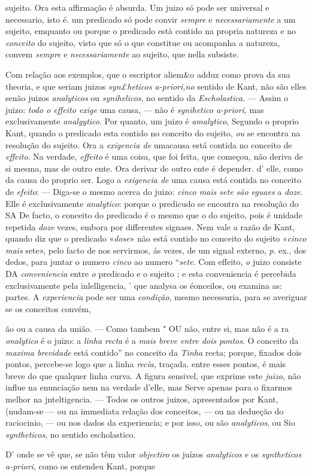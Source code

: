 sujeito. Ora esta affirmação é absurda. Um juizo só pode ser universal e necessario, isto é. um predicado só pode convir \emph{sempre} e \emph{necessariamente} a um sujeito, emquanto ou porque o predicado està contido na propria natureza e no \emph{conceito} do sujeito, visto que só o que constitue ou acompanha a natureza, convem \emph{sempre} e \emph{necessariamente} ao sujeito, que nella subsiste.\par Com relação aos exemplos, que o escriptor aliem\&o adduz como prova da sua theoria, e que seriam juizos \emph{syn£heticos a-priori,no} sentido de Kant, não são elles senão juizos \emph{analyticos} ou \emph{synihelicos}, no sentido da \emph{Escholastica}. --- Assim o juizo: \emph{todo o effeito exige} uma causa, --- não é \emph{synihetico a-priori}, mas exclusivamente \emph{analgytico}. Por quanto, um juizo é \emph{amalytico}, Segundo o proprio Kant, quando o predicado esta contido no conceito do sujeito, \emph{ou} se encontra na resolução do sujeito. Ora a \emph{exigencia de} umacausa está contida no conceito de \emph{effeito}. Na verdade, \emph{effeito} é uma coisa, que foi feita, que começou, não deriva de si mesma, mas de outro ente. Ora derivar de outro ente é depender. d' elle, como da causa do proprio ser. Logo a \emph{exigencia de} uma causa está contida no conceito de \emph{efeito}: --- Diga-se o mesmo acerca do juizo: \emph{cinco mais sete são eguaes} a \emph{doze}. Elle é exclusivamente \emph{analytico}: porque o predicudo se encontra na resolução do SA De facto, o conceito do predicado é o mesmo que o do sujeito, pois é unidade repetida \emph{doze} vezes, embora por differentes signaes. Nem vale a razão de Kant, quando diz que o predicado «\emph{dose}» não está contido no conceito do sujeito «\emph{cinco mais} sete», pelo facto de nos servirmos, ás vezes, de um signal externo, \emph{p}. ex., dos dedos, para juntar o numero \emph{cinco} ao numero “\emph{sete}. Com effeito, \emph{o} juizo consiste DA \emph{conveniencia} entre \emph{o} predicado e o sujeito ; e esta conveniencia é percebida exclusivamente pela inlelligencia, ' que analysa os éonceilos, ou examina as: partes. A \emph{experiencia} pode ser uma \emph{condição}, mesmo necessuria, para se averiguar se os conceitos convém,\par ão ou a causa da união. --- Como tambem " OU não, entre si, mas não é a ra \emph{onalytico} é o juizo: a \emph{linha recta} é a \emph{mais breve entre dois pontos}. O conceito da \emph{maxima brevidade} está contido” no conceito da \emph{Tinha} recta; porque, fixados dois pontos, percebe-se logo que a linha \emph{recía}, traçada. entre esses pontos, é mais breve do que qualquer linha curva. A figura sensivel, que exprime este \emph{juizo}, não influe na enunciação nem na verdade d'elle, mas Serve apenas para o fixarmos melhor na jnteltigencia. --- Todos os outros juizos, apresentados por Kant, (nudam-se --- ou na immediata relação dos conceitos, --- ou na dedueção do raciocinio, --- ou nos dados da experiencia; e por isso, ou são \emph{analyticos}, ou Sio \emph{syntheticos}, no sentido escholastico.\par D' onde se vê que, se não têm valor \emph{objectiro} os juízos \emph{analyticos} e os \emph{syntheticos a-priori}, como os entendeu Kant, porque 